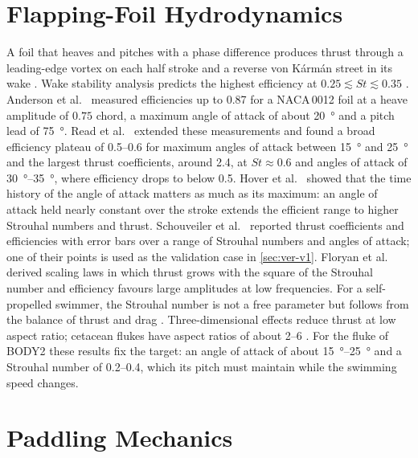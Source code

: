 \section{Flapping-Foil Hydrodynamics}
\label{sec:rw-foil}

A foil that heaves and pitches with a phase difference produces thrust through a leading-edge vortex on each
half stroke and a reverse von K\'arm\'an street in its wake \cite{Triantafyllou1991}. Wake stability analysis
predicts the highest efficiency at $0.25\lesssim\mathit{St}\lesssim0.35$ \cite{Triantafyllou1991}. Anderson et
al.\ \cite{Anderson1998} measured efficiencies up to 0.87 for a NACA\,0012 foil at a heave amplitude of
$0.75$ chord, a maximum angle of attack of about \SI{20}{\degree} and a pitch lead of \SI{75}{\degree}. Read
et al.\ \cite{Read2003} extended these measurements and found a broad efficiency plateau of 0.5--0.6 for
maximum angles of attack between \SI{15}{\degree} and \SI{25}{\degree} and the largest thrust coefficients,
around 2.4, at $\mathit{St}\approx0.6$ and angles of attack of \SIrange{30}{35}{\degree}, where efficiency drops
to below 0.5. Hover et al.\ \cite{Hover2004} showed that the time history of the angle of attack matters as
much as its maximum: an angle of attack held nearly constant over the stroke extends the efficient range to
higher Strouhal numbers and thrust. Schouveiler et al.\ \cite{Schouveiler2005} reported thrust coefficients
and efficiencies with error bars over a range of Strouhal numbers and angles of attack; one of their points
is used as the validation case in \cref{sec:ver-v1}. Floryan et al.\ \cite{Floryan2017} derived scaling laws
in which thrust grows with the square of the Strouhal number and efficiency favours large amplitudes at low
frequencies. For a self-propelled swimmer, the Strouhal number is not a free parameter but follows from the
balance of thrust and drag \cite{Eloy2012}. Three-dimensional effects reduce thrust at low aspect ratio;
cetacean flukes have aspect ratios of about 2--6 \cite{Ayancik2020}. For the fluke of BODY2 these results fix the target: an
angle of attack of about \SIrange{15}{25}{\degree} and a Strouhal number of 0.2--0.4, which its pitch must maintain while the
swimming speed changes.

\section{Paddling Mechanics}
\label{sec:rw-paddle}

